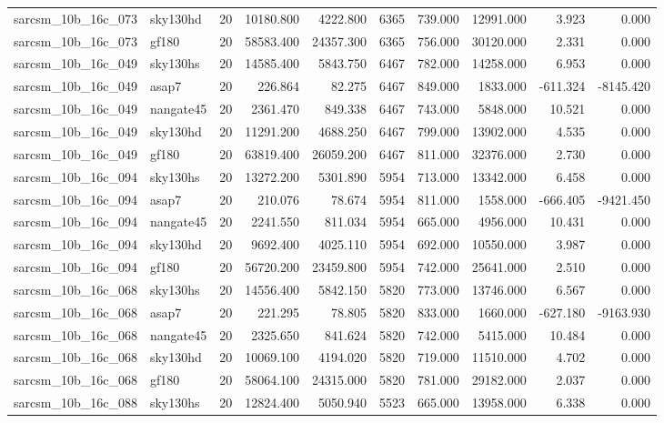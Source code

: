 \documentclass{article}
\begin{document}
\begin{longtable}{llrrrrrrrr}
sarcsm\_10b\_16c\_073 & sky130hd & 20 & 10180.800 & 4222.800 & 6365 & 739.000 & 12991.000 & 3.923 & 0.000 \\
sarcsm\_10b\_16c\_073 & gf180 & 20 & 58583.400 & 24357.300 & 6365 & 756.000 & 30120.000 & 2.331 & 0.000 \\
sarcsm\_10b\_16c\_049 & sky130hs & 20 & 14585.400 & 5843.750 & 6467 & 782.000 & 14258.000 & 6.953 & 0.000 \\
sarcsm\_10b\_16c\_049 & asap7 & 20 & 226.864 & 82.275 & 6467 & 849.000 & 1833.000 & -611.324 & -8145.420 \\
sarcsm\_10b\_16c\_049 & nangate45 & 20 & 2361.470 & 849.338 & 6467 & 743.000 & 5848.000 & 10.521 & 0.000 \\
sarcsm\_10b\_16c\_049 & sky130hd & 20 & 11291.200 & 4688.250 & 6467 & 799.000 & 13902.000 & 4.535 & 0.000 \\
sarcsm\_10b\_16c\_049 & gf180 & 20 & 63819.400 & 26059.200 & 6467 & 811.000 & 32376.000 & 2.730 & 0.000 \\
sarcsm\_10b\_16c\_094 & sky130hs & 20 & 13272.200 & 5301.890 & 5954 & 713.000 & 13342.000 & 6.458 & 0.000 \\
sarcsm\_10b\_16c\_094 & asap7 & 20 & 210.076 & 78.674 & 5954 & 811.000 & 1558.000 & -666.405 & -9421.450 \\
sarcsm\_10b\_16c\_094 & nangate45 & 20 & 2241.550 & 811.034 & 5954 & 665.000 & 4956.000 & 10.431 & 0.000 \\
sarcsm\_10b\_16c\_094 & sky130hd & 20 & 9692.400 & 4025.110 & 5954 & 692.000 & 10550.000 & 3.987 & 0.000 \\
sarcsm\_10b\_16c\_094 & gf180 & 20 & 56720.200 & 23459.800 & 5954 & 742.000 & 25641.000 & 2.510 & 0.000 \\
sarcsm\_10b\_16c\_068 & sky130hs & 20 & 14556.400 & 5842.150 & 5820 & 773.000 & 13746.000 & 6.567 & 0.000 \\
sarcsm\_10b\_16c\_068 & asap7 & 20 & 221.295 & 78.805 & 5820 & 833.000 & 1660.000 & -627.180 & -9163.930 \\
sarcsm\_10b\_16c\_068 & nangate45 & 20 & 2325.650 & 841.624 & 5820 & 742.000 & 5415.000 & 10.484 & 0.000 \\
sarcsm\_10b\_16c\_068 & sky130hd & 20 & 10069.100 & 4194.020 & 5820 & 719.000 & 11510.000 & 4.702 & 0.000 \\
sarcsm\_10b\_16c\_068 & gf180 & 20 & 58064.100 & 24315.000 & 5820 & 781.000 & 29182.000 & 2.037 & 0.000 \\
sarcsm\_10b\_16c\_088 & sky130hs & 20 & 12824.400 & 5050.940 & 5523 & 665.000 & 13958.000 & 6.338 & 0.000 \\

\end{longtable}
\end{document}
